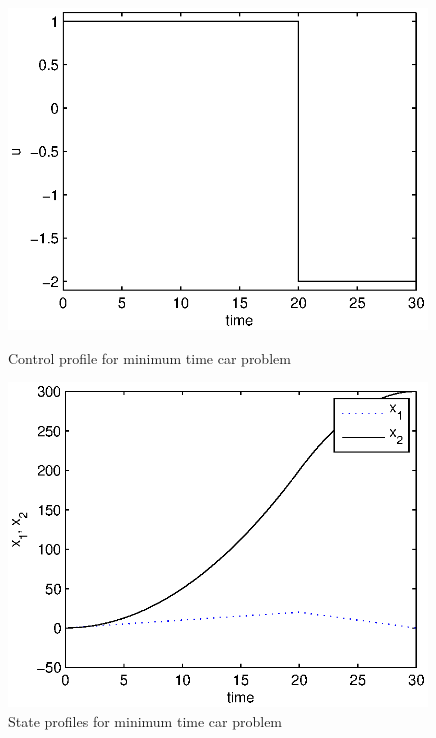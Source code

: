 \begin{figure}[htb]
\begin{minipage}[t]{0.48\linewidth}
\centering
\includegraphics[width=0.99\textwidth]{examples/problem-car/car_u.eps}
\caption[Tutorial example car: control profile]{Control profile for
  minimum time car problem} \label{fig:car_u} 
\end{minipage}
\begin{minipage}[t]{0.48\linewidth}
\centering
\includegraphics[width=0.99\textwidth]{examples/problem-car/car_x.eps}
\caption[Tutorial example car: state profile]{State profiles for
  minimum time car problem} \label{fig:car_x} 
\end{minipage}
\end{figure}

